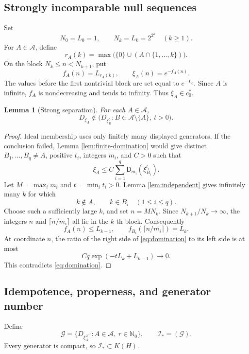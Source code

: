 \documentclass[11pt]{article}
\newtheorem{lemma}[theorem]{Lemma}
\newcommand{\KH}{K(H)}
\newcommand{\Istar}{\mathcal I_{\!*}}
\newcommand{\amp}{\mathsf D}
\begin{document}
\subsection{Strongly incomparable null sequences}

Set
\[
 N_0=L_0=1,
 \qquad
 N_k=L_k=2^{2^k}\quad(k\geq1).
\]
For \(A\in\mathscr A\), define
\[
 r_A(k)=\max\bigl(\{0\}\cup(A\cap\{1,\ldots,k\})\bigr).
\]
On the block \(N_k\leq n<N_{k+1}\), put
\[
       f_A(n)=L_{r_A(k)},
       \qquad
       \xi_A(n)=e^{-f_A(n)}.
\]
The values before the first nontrivial block are set equal to \(e^{-L_0}\).
Since \(A\) is infinite, \(f_A\) is nondecreasing and tends to infinity.
Thus \(\xi_A\in c_0^*\).

\begin{lemma}[Strong separation]\label{lem:separation}
For each \(A\in\mathscr A\),
\[
 D_{\xi_A}\notin
 \bigl(D_{\xi_B^t}:B\in\mathscr A\setminus\{A\},\ t>0\bigr).
\]
\end{lemma}

\begin{proof}
Ideal membership uses only finitely many displayed generators.  If the
conclusion failed, Lemma \ref{lem:finite-domination} would give distinct
\(B_1,\ldots,B_q\neq A\), positive \(t_i\), integers \(m_i\), and \(C>0\)
such that
\[
        \xi_A\leq C\sum_{i=1}^q
                    \amp_{m_i}(\xi_{B_i}^{t_i}).
\tag{1}\label{eq:domination}
\]
Let \(M=\max_i m_i\) and \(t=\min_i t_i>0\).  Lemma
\ref{lem:independent} gives infinitely many \(k\) for which
\[
              k\notin A,\qquad k\in B_i\quad(1\leq i\leq q).
\]
Choose such a sufficiently large \(k\), and set \(n=MN_k\).  Since
\(N_{k+1}/N_k\to\infty\), the integers \(n\) and
\(\lceil n/m_i\rceil\) all lie in the \(k\)-th block.  Consequently
\[
        f_A(n)\leq L_{k-1},
        \qquad
        f_{B_i}(\lceil n/m_i\rceil)=L_k.
\]
At coordinate \(n\), the ratio of the right side of
\eqref{eq:domination} to its left side is at most
\[
             Cq\exp(-tL_k+L_{k-1})\longrightarrow0.
\]
This contradicts \eqref{eq:domination}.
\end{proof}

\subsection{Idempotence, properness, and generator number}

Define
\[
 \mathcal G=
 \{D_{\xi_A^{\,2^{-r}}}:A\in\mathscr A,\ r\in\mathbb N_0\},
 \qquad
 \Istar=(\mathcal G).
\]
Every generator is compact, so \(\Istar\subset\KH\).
\end{document}
